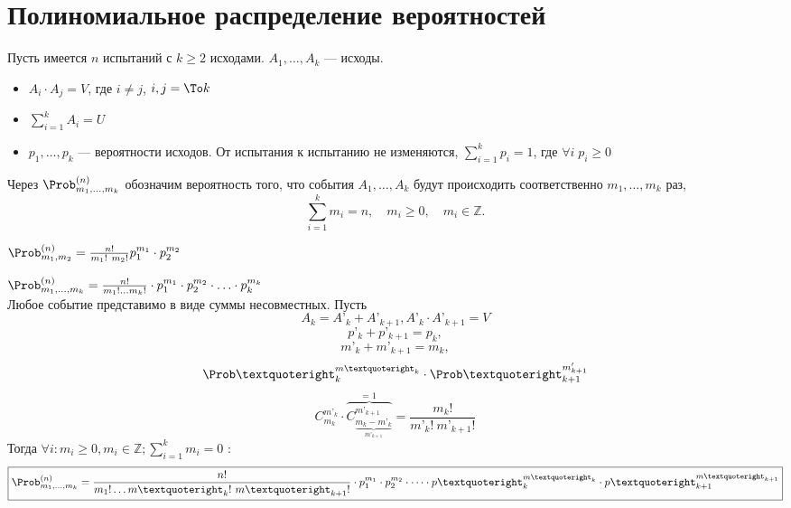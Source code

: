 \section{Полиномиальное распределение вероятностей}
Пусть имеется $n$ испытаний с $k \geqslant 2$ исходами. $A_1, \dots, A_k$ --- исходы.
\begin{itemize}
	\item $A_i \cdot A_j = V$, где $i \not = j$, $i, j = \To k$
	\item $\sum\limits_{i=1}^k A_i = U$
	\item $p_1, \dots, p_k$ --- вероятности исходов. От испытания к испытанию не изменяются, $\sum\limits_{i=1}^k p_i = 1$, где $\forall i \; p_i \geq 0$
\end{itemize}
Через $\Prob_{m_1, \dots, m_k}^{(n)}$ обозначим вероятность того, что события $A_1, \dots, A_k$ будут происходить соответственно $m_1, \dots, m_k$ раз,
\[
	\sum\limits_{i=1}^k m_i = n, \quad m_i \geqslant 0, \quad m_i \in \mathbb{Z}.
\]
\begin{description}[leftmargin=0cm]
	\item[$k = 2$:] $\Prob_{m_1, m_2}^{(n)} = \frac{n!}{m_1 !\ m_2 !} p_1^{m_1} \cdot p_2^{m_2}$
	\item[$k \geqslant 2$:] $\Prob_{m_1, \ldots, m_k}^{(n)} = \frac{n!}{m_1 ! \ldots m_k !} \cdot p_1^{m_1} \cdot p_2^{m_2} \cdot \ldots \cdot p_k^{m_k}$ \\
	      Любое событие представимо в виде суммы несовместных. Пусть
		  \[ A_k = A’_k + A’_{k+1}, A’_k \cdot A’_{k+1} = V \]
		  \[ p’_k + p’_{k+1} = p_k, \]
		  \[ m’_k + m’_{k+1} = m_k, \]
		  \[ {\Prob’}_{k}^{m’_{k}} \cdot {\Prob’}_{k+1}^{m'_{k+1}} \]
	      \[ C_{m_k}^{{m’}_k} \cdot \overbrace{ C_{\underbrace{{m_k - {m’}_k}}_{{m’}_{k+1}}}^{{m’}_{k+1}} }^{\text{= 1}} = \frac{m_k !}{{m’}_k !\ {m’}_{k+1} !} \]
	      Тогда $ \forall i : m_i \geqslant 0, m_i \in \mathbb{Z};  \sum\limits_{i=1}^k m_i = 0$ :
	      \[
		      \boxed{\Prob_{m_1, \dots, m_k}^{(n)} = \frac{n!}{{m}_1 ! \ldots {m’}_k !\ {m’}_{k+1} !} \cdot p_1^{m_1} \cdot p_2^{m_2} \cdot \dots \cdot {p’}_k^{{m’}_k} \cdot {p’}_{k+1}^{{m’}_{k+1}}}
	      \]
\end{description}

